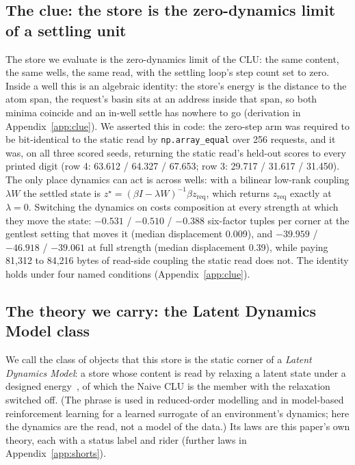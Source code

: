 \documentclass{article} %
\begin{document}
\subsection{The clue: the store is the zero-dynamics limit of a settling unit}
\label{sec:clue}

The store we evaluate is the zero-dynamics limit of the CLU: the same content, the same wells,
the same read, with the settling loop's step count set to zero. Inside a well this is an
algebraic identity: the store's energy is the distance to the atom span, the request's basin sits
at an address inside that span, so both minima coincide and an in-well settle has nowhere to go
(derivation in Appendix~\ref{app:clue}). We asserted this in code: the zero-step arm was required to be bit-identical to
the static read by \texttt{np.array\_equal} over 256 requests, and it was, on all three scored
seeds, returning the static read's held-out scores to every printed digit (row 4: 63.612 /
64.327 / 67.653; row 3: 29.717 / 31.617 / 31.450). %
The only place dynamics can act is across wells: with a bilinear low-rank coupling $\lambda W$
the settled state is $z^\star=(\beta I-\lambda W)^{-1}\beta z_{\text{req}}$, which returns
$z_{\text{req}}$ exactly at $\lambda=0$. Switching the dynamics on costs composition at every
strength at which they move the state: $-0.531$ / $-0.510$ / $-0.388$ six-factor tuples per
corner at the gentlest setting that moves it (median displacement 0.009), and $-39.959$ /
$-46.918$ / $-39.061$ at full strength (median displacement 0.39), while paying 81,312 to 84,216
bytes of read-side coupling the static read does not. %
The identity holds under four named conditions (Appendix~\ref{app:clue}).

\subsection{The theory we carry: the Latent Dynamics Model class}
\label{sec:theory}

We call the class of objects that this store is the static corner of a \emph{Latent Dynamics
Model}: a store whose content is read by relaxing a latent state under a designed energy~\citep{hopfield1982neural,krotov2016dense,ramsauer2021hopfield,hoover2023energy,kong2024reservoir}, of
which the Naive CLU is the member with the relaxation switched off. (The phrase is used in
reduced-order modelling and in model-based reinforcement learning for a learned surrogate of an
environment's dynamics; here the dynamics are the read, not a model of the data.) Its laws are this paper's own theory, each with a status label and rider (further laws in Appendix~\ref{app:shorts}).
\end{document}

